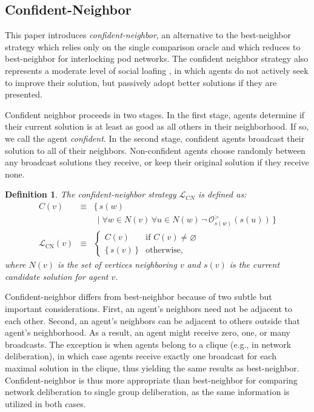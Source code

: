\documentclass[twocolumn,10pt]{article}
\newtheorem{definition}{Definition}
\begin{document}
\subsection{Confident-Neighbor}
This paper introduces {\em confident-neighbor}, an alternative to the best-neighbor strategy which relies only on the single comparison oracle and which reduces to best-neighbor for interlocking pod networks. The confident neighbor strategy also represents a moderate level of social loafing \cite{karau_social_1993}, in which agents do not actively seek to improve their solution, but passively adopt better solutions if they are presented.

Confident neighbor proceeds in two stages. In the first stage, agents determine if their current solution is at least as good as all others in their neighborhood. If so, we call the agent {\em confident}. In the second stage, confident agents broadcast their solution to all of their neighbors. Non-confident agents choose randomly between any broadcast solutions they receive, or keep their original solution if they receive none.

\begin{definition}
The confident-neighbor strategy $\mathcal{L}_{CN}$ is defined as:
\begin{eqnarray}
C(v) &\equiv& \{
\, s(w)  \nonumber \\
&& \,
\mid
\forall w \!\in\! N(v) \, \forall u \!\in\! N(w) \,
\lnot \, \mathcal{O}^{>}_{s(w)}(s(u)) \,
\}
\\
\mathcal{L}_{\text{CN}}(v)
&\equiv& 
\begin{cases}
C(v) & \text{if } C(v) \neq \varnothing \\
\{ \, s(v) \, \}& \text{otherwise,}
\end{cases}
\end{eqnarray}
where $N(v)$ is the set of vertices neighboring $v$ and $s(v)$ is the current candidate solution for agent $v$.
\end{definition}

Confident-neighbor differs from best-neighbor because of two subtle but important considerations. First, an agent's neighbors need not be adjacent to each other. Second, an agent's neighbors can be adjacent to others outside that agent's neighborhood. As a result, an agent might receive zero, one, or many broadcasts. The exception is when agents belong to a clique (e.g., in network deliberation), in which case agents receive exactly one broadcast for each maximal solution in the clique, thus yielding the same results as best-neighbor. Confident-neighbor is thus more appropriate than best-neighbor for comparing network deliberation to single group deliberation, as the same information is utilized in both cases.
\end{document}

